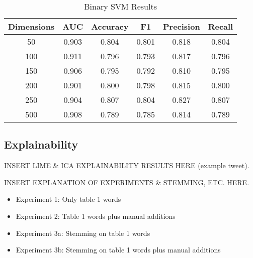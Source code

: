 \documentclass{article}
\begin{document}
\begin{table}
 \caption{Binary SVM Results}
  \centering
  \begin{tabular}{|c|c|c|c|c|c|}
    \hline
    \rowcolor{lightgray} \textbf{Dimensions} & \textbf{AUC} & \textbf{Accuracy} & \textbf{F1} & \textbf{Precision} & \textbf{Recall} \\
    \hline
    50 & 0.903 & 0.804 & 0.801 & 0.818 & 0.804 \\
    \hline
    100 & \cellcolor{green} 0.911 & 0.796 & 0.793 & 0.817 & 0.796 \\
    \hline
    150 & 0.906 & 0.795 & 0.792 & 0.810 & 0.795 \\
    \hline
    200 & 0.901 & 0.800 & 0.798 & 0.815 & 0.800 \\
    \hline
    \cellcolor{green} 250 & 0.904 & \cellcolor{green} 0.807 & \cellcolor{green} 0.804 & \cellcolor{green} 0.827 & \cellcolor{green} 0.807 \\
    \hline
    500 & 0.908 & 0.789 & 0.785 & 0.814 & 0.789 \\
    \hline
  \end{tabular}
  \label{tab:svm}
\end{table}

\hypertarget{explainability}{%
\subsection{Explainability}\label{explainability}}

INSERT LIME \& ICA EXPLAINABILITY RESULTS HERE (example tweet).

INSERT EXPLANATION OF EXPERIMENTS \& STEMMING, ETC. HERE.

\begin{itemize}
\tightlist
\item
  Experiment 1: Only table 1 words
\item
  Experiment 2: Table 1 words plus manual additions
\item
  Experiment 3a: Stemming on table 1 words
\item
  Experiment 3b: Stemming on table 1 words plus manual additions
\end{itemize}
\end{document}
